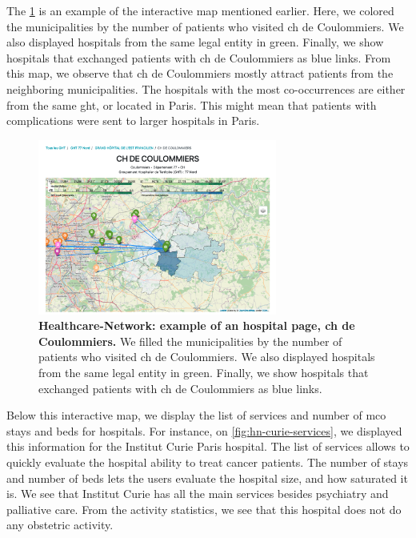 The \cref{fig:hn-coulommiers-co-occ} is an example of the interactive map
mentioned earlier. Here, we colored the municipalities by the number of patients
who visited \ac{ch} de Coulommiers. We also displayed hospitals from the same
legal entity in green. Finally, we show hospitals that exchanged patients with
\ac{ch} de Coulommiers as blue links. From this map, we observe that \ac{ch} de
Coulommiers mostly attract patients from the neighboring municipalities. The
hospitals with the most co-occurrences are either from the same \ac{ght}, or
located in Paris. This might mean that patients with complications were sent to
larger hospitals in Paris.

\begin{figure}[H]
    \includegraphics[width=0.7\textwidth]{images/healthcare-network/coulommiers-co-occ.png}
    \centering
    \caption{ \textbf{Healthcare-Network: example of an hospital page, \acf{ch}
            de Coulommiers.} We filled the municipalities by the number of patients
        who visited \ac{ch} de Coulommiers. We also displayed hospitals from the
        same legal entity in green. Finally, we show hospitals that exchanged
        patients with \ac{ch} de Coulommiers as blue links. }
    \label{fig:hn-coulommiers-co-occ}
\end{figure}

Below this interactive map, we display the list of services and number of
\ac{mco} stays and beds for hospitals. For instance, on
\cref{fig:hn-curie-services}, we displayed this information for the Institut
Curie Paris hospital. The list of services allows to quickly evaluate the
hospital ability to treat cancer patients. The number of stays and number of
beds lets the users evaluate the hospital size, and how saturated it is. We see
that Institut Curie has all the main services besides psychiatry and palliative
care. From the activity statistics, we see that this hospital does not do any
obstetric activity.

